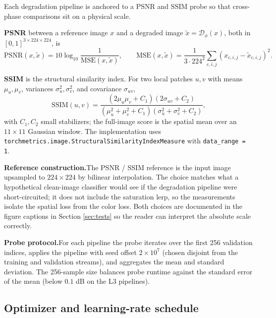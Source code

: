 Each degradation pipeline is anchored to a $\mathrm{PSNR}$ and $\mathrm{SSIM}$
probe so that cross-phase comparisons sit on a physical scale.

\textbf{PSNR} \cite{huynh2008psnr} between a reference image $x$ and a
degraded image $\tilde x = \mathcal{D}_{\phi}(x)$, both in $[0, 1]^{3 \times 224 \times 224}$, is
\begin{equation}
  \mathrm{PSNR}(x, \tilde x) = 10 \log_{10} \frac{1}{\mathrm{MSE}(x, \tilde x)},
  \qquad
  \mathrm{MSE}(x, \tilde x) = \frac{1}{3 \cdot 224^2} \sum_{c, i, j} (x_{c,i,j} - \tilde x_{c,i,j})^2.
  \label{eq:psnr}
\end{equation}

\textbf{SSIM} \cite{wang2004ssim} is the structural similarity index. For
two local patches $u, v$ with means $\mu_u, \mu_v$, variances
$\sigma_u^2, \sigma_v^2$, and covariance $\sigma_{uv}$,
\begin{equation}
  \mathrm{SSIM}(u, v) = \frac{(2 \mu_u \mu_v + C_1)(2 \sigma_{uv} + C_2)}{(\mu_u^2 + \mu_v^2 + C_1)(\sigma_u^2 + \sigma_v^2 + C_2)},
  \label{eq:ssim}
\end{equation}
with $C_1, C_2$ small stabilizers; the full-image score is the spatial mean
over an $11 \times 11$ Gaussian window. The implementation uses
\texttt{torchmetrics.image.StructuralSimilarityIndexMeasure} with
\texttt{data\_range = 1}.

\textbf{Reference construction.}\quad The PSNR / SSIM reference is the
input image upsampled to $224 \times 224$ by bilinear interpolation. The
choice matches what a hypothetical clean-image classifier would see if the
degradation pipeline were short-circuited; it does not include the
saturation lerp, so the measurements isolate the spatial loss from the
color loss. Both choices are documented in the figure captions in
Section \ref{sec:tests} so the reader can interpret the absolute scale
correctly.

\textbf{Probe protocol.}\quad For each pipeline the probe iterates over
the first 256 validation indices, applies the pipeline with seed offset
$2 \times 10^7$ (chosen disjoint from the training and validation streams),
and aggregates the mean and standard deviation. The 256-sample size
balances probe runtime against the standard error of the mean (below
$0.1$ dB on the L3 pipelines).

\subsection{Optimizer and learning-rate schedule}
\label{sec:design:optim}

